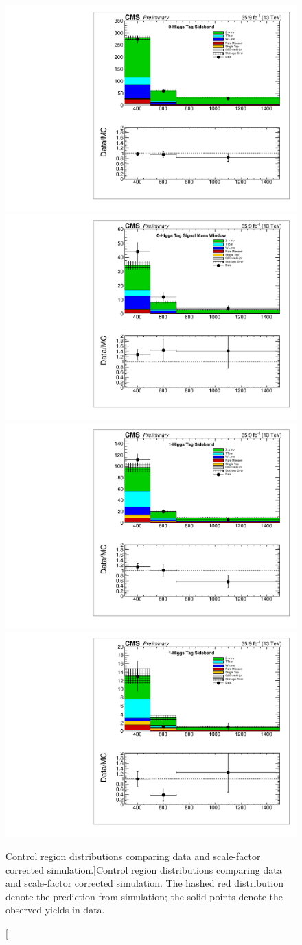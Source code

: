 \begin{figure}[hbp!]
\centering
\includegraphics[trim={5px 5px 5px 5px},clip,width=0.425\linewidth]{figs/Unblinding_antitagSB.pdf}
\includegraphics[trim={5px 5px 5px 5px},clip,width=0.425\linewidth]{figs/Unblinding_antitagSR.pdf}\\
\includegraphics[trim={5px 5px 5px 5px},clip,width=0.425\linewidth]{figs/Unblinding_tagSB.pdf}
\includegraphics[trim={5px 5px 5px 5px},clip,width=0.425\linewidth]{figs/Unblinding_doubletagSB.pdf}\\
\caption
[Control region \ptmiss distributions comparing data and scale-factor corrected simulation.]{Control region \ptmiss distributions comparing data and scale-factor corrected simulation. The hashed red distribution denote the prediction from simulation; the solid points denote the observed yields in data.}
\label{fig:UnblindCR}
\end{figure}

